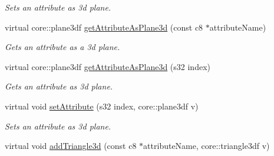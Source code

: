 \begin{DoxyCompactItemize}
\begin{DoxyCompactList}\small\item\em Sets an attribute as 3d plane. \end{DoxyCompactList}\item 
virtual core\-::plane3df \hyperlink{classirr_1_1io_1_1_c_attributes_ac9a5b1d01501e773b74db3766737f241}{get\-Attribute\-As\-Plane3d} (const c8 $\ast$attribute\-Name)
\begin{DoxyCompactList}\small\item\em Gets an attribute as a 3d plane. \end{DoxyCompactList}\item 
virtual core\-::plane3df \hyperlink{classirr_1_1io_1_1_c_attributes_a17d9f53774d756e5dc8ac4bf23670eb4}{get\-Attribute\-As\-Plane3d} (s32 index)
\begin{DoxyCompactList}\small\item\em Gets an attribute as 3d plane. \end{DoxyCompactList}\item 
\hypertarget{classirr_1_1io_1_1_c_attributes_aa73c65d913c680619785e1ae9d0de2c7}{virtual void \hyperlink{classirr_1_1io_1_1_c_attributes_aa73c65d913c680619785e1ae9d0de2c7}{set\-Attribute} (s32 index, core\-::plane3df v)}\label{classirr_1_1io_1_1_c_attributes_aa73c65d913c680619785e1ae9d0de2c7}

\begin{DoxyCompactList}\small\item\em Sets an attribute as 3d plane. \end{DoxyCompactList}\item 
\hypertarget{classirr_1_1io_1_1_c_attributes_ae92fa8b33cb8aafd8e67ddfeec18ea0f}{virtual void \hyperlink{classirr_1_1io_1_1_c_attributes_ae92fa8b33cb8aafd8e67ddfeec18ea0f}{add\-Triangle3d} (const c8 $\ast$attribute\-Name, core\-::triangle3df v)}\label{classirr_1_1io_1_1_c_attributes_ae92fa8b33cb8aafd8e67ddfeec18ea0f}


\end{DoxyCompactItemize}
